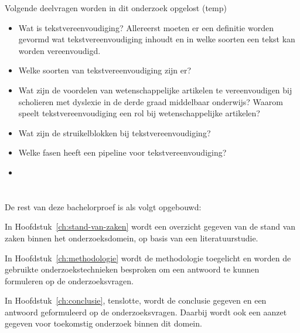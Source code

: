 Volgende deelvragen worden in dit onderzoek opgelost (temp)
\begin{itemize}
	\item Wat is tekstvereenvoudiging? Allereerst moeten er een definitie worden gevormd wat tekstvereenvoudiging inhoudt en in welke soorten een tekst kan worden vereenvoudigd. 
	\item Welke soorten van tekstvereenvoudiging zijn er?
	\item Wat zijn de voordelen van wetenschappelijke artikelen te vereenvoudigen bij scholieren met dyslexie in de derde graad middelbaar onderwijs? Waarom speelt tekstvereenvoudiging een rol bij wetenschappelijke artikelen?
	\item Wat zijn de struikelblokken bij tekstvereenvoudiging?
	\item Welke fasen heeft een pipeline voor tekstvereenvoudiging? 
	\item 
\end{itemize}


\section{}%
\label{sec:onderzoeksdoelstelling}




\section{}%
\label{sec:opzet-bachelorproef}


De rest van deze bachelorproef is als volgt opgebouwd:

In Hoofdstuk~\ref{ch:stand-van-zaken} wordt een overzicht gegeven van de stand van zaken binnen het onderzoeksdomein, op basis van een literatuurstudie.

In Hoofdstuk~\ref{ch:methodologie} wordt de methodologie toegelicht en worden de gebruikte onderzoekstechnieken besproken om een antwoord te kunnen formuleren op de onderzoeksvragen.


In Hoofdstuk~\ref{ch:conclusie}, tenslotte, wordt de conclusie gegeven en een antwoord geformuleerd op de onderzoeksvragen. Daarbij wordt ook een aanzet gegeven voor toekomstig onderzoek binnen dit domein.